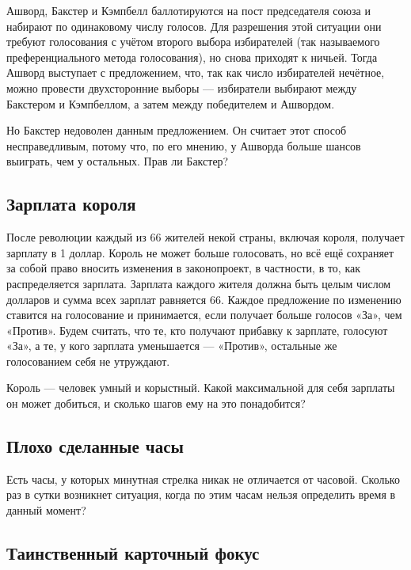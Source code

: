 Ашворд, Бакстер и Кэмпбелл баллотируются на пост председателя союза %
и набирают по одинаковому числу голосов.
Для разрешения этой ситуации они требуют голосования с учётом второго выбора избирателей (так называемого преференциального метода голосования), но снова приходят к ничьей.
Тогда Ашворд выступает с предложением, что, так как число избирателей нечётное, можно провести двухсторонние выборы --- избиратели выбирают между Бакстером и Кэмпбеллом, а затем между победителем и Ашвордом.

Но Бакстер недоволен данным предложением.
Он считает этот способ несправедливым, потому что, по его мнению, у Ашворда больше шансов выиграть, чем у остальных.
Прав ли Бакстер?

\subsection*{Зарплата короля}%

После революции каждый из 66 жителей некой страны, включая короля, получает зарплату в 1 доллар.
Король не может больше голосовать, но всё ещё сохраняет за собой право вносить изменения в законопроект, в частности, в то, как распределяется зарплата.
Зарплата каждого жителя должна быть целым числом долларов и сумма всех зарплат равняется 66.
Каждое предложение по изменению ставится на голосование и принимается, если получает больше голосов «За», чем «Против».
Будем считать, что те, кто получают прибавку к зарплате, голосуют «За», а те, у кого зарплата уменьшается --- «Против», остальные же голосованием себя не утруждают.

Король --- человек умный и корыстный.
Какой максимальной для себя зарплаты он может добиться, и сколько шагов ему на это понадобится?

\subsection*{Плохо сделанные часы}%

Есть часы, у которых минутная стрелка никак не отличается от часовой.
Сколько раз в сутки возникнет ситуация, когда по этим часам нельзя определить время в данный момент?

\subsection*{Таинственный карточный фокус}%

